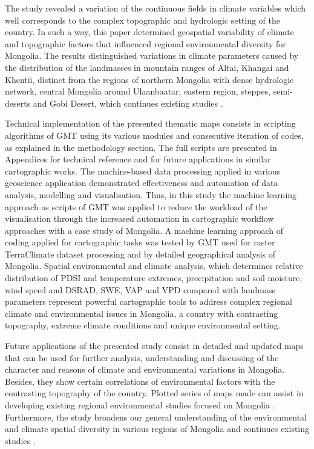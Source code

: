 \documentclass[geosciences,article,submit,pdftex,moreauthors]{Definitions/mdpi}
\begin{document}
The study revealed a variation of the continuous fields in climate variables which well corresponds to the complex topographic and hydrologic setting of the country. In such a way, this paper determined geospatial variability of climate and topographic factors that influenced regional environmental diversity for Mongolia. The results distinguished variations in climate parameters caused by the distribution of the landmasses in mountain ranges of Altai, Khangai and Khentii, distinct from the regions of northern Mongolia with dense hydrologic network, central Mongolia around Ulaanbaatar, eastern region, steppes, semi-deserts and Gobi Desert, which continues existing studies \cite{Cook,Ulaankhuu}. 

Technical implementation of the presented thematic maps consists in scripting algorithms of GMT using its various modules and consecutive iteration of codes, as explained in the methodology section. The full scripts are presented in Appendices for technical reference and for future applications in similar cartographic works. The machine-based data processing applied in various geoscience application \cite{Lemenkova2019c,Lemenkov2021} demonstrated effectiveness and automation of data analysis, modelling and visualisation. Thus, in this study the machine learning approach as scripts of GMT was applied to reduce the workload of the visualisation through the increased automation in cartographic workflow approaches with a case study of Mongolia.  A machine learning approach of coding applied for cartographic tasks was tested by GMT used for raster TerraClimate dataset processing and by detailed geographical analysis of Mongolia. Spatial environmental and climate analysis, which determines relative distribution of PDSI and temperature extremes, precipitation and soil moisture, wind speed and DSRAD, SWE, VAP and VPD compared with landmass parameters represent powerful cartographic tools to address complex regional climate and environmental issues in Mongolia, a country with contrasting topography, extreme climate conditions and unique environmental setting. 

Future applications of the presented study consist in detailed and updated maps that can be used for further analysis, understanding and discussing of the character and reasons of climate and environmental variations in Mongolia. Besides, they show certain correlations of environmental factors with the contrasting topography of the country. Plotted series of maps made can assist in developing existing regional environmental studies focused on Mongolia \cite{MAS,Pfeiffer}. Furthermore, the study broadens our general understanding of the environmental and climate spatial diversity in various regions of Mongolia and continues existing studies \cite{Altanbold,Jamyansuren,Jugder}. 
\end{document}

